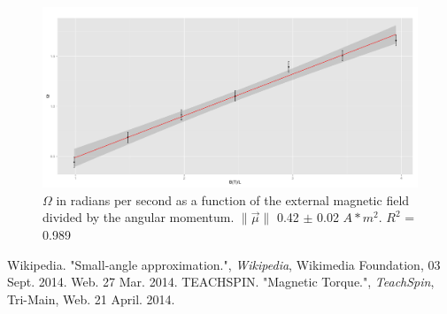 \documentclass[twocolumn,secnumarabic,amssymb, nobibnotes, aps, pra]{revtex4}
\newcommand{\norm}[1]{\lVert#1\rVert}
\begin{document}
\begin{figure} [b]  %
\begin{center}
\includegraphics[scale=.5]{precession.pdf} 
\end{center}
\caption{$\Omega$ in radians per second as a function of the external magnetic field divided by the angular momentum. $\norm{\vec{\mu}}$ 0.42 $\pm$ 0.02 $A * m^2$.  $R^2$ = 0.989}
\label{fig:precession}
\end{figure}



\begin{thebibliography}{5}
 Wikipedia. "Small-angle approximation.", \textit{Wikipedia}, Wikimedia Foundation, 03 Sept. 2014. Web. 27 Mar. 2014.
 TEACHSPIN. "Magnetic Torque.", \textit{TeachSpin}, Tri-Main, Web. 21 April. 2014.

\end{thebibliography}
\end{document}

